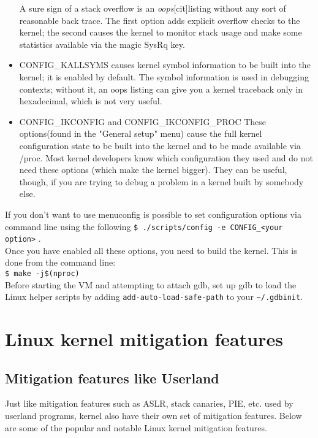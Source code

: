 \documentclass{masterthesis}
\begin{document}
\begin{itemize}
A sure sign of a stack overflow is an \emph{oops}[cit]listing without any sort of reasonable back trace. The first option adds explicit overflow checks to the kernel; the second causes the kernel to monitor stack usage and make some statistics available via the magic SysRq key.
\item CONFIG_KALLSYMS causes kernel symbol information to be built into the kernel; it is enabled by default. The symbol information is used in debugging contexts; without it, an oops listing can give you a kernel traceback only in hexadecimal, which is not very useful.
\item CONFIG_IKCONFIG and CONFIG_IKCONFIG_PROC
These options(found in the "General setup" menu)  cause the full kernel configuration state to be built into the kernel and to be made available via /proc. Most kernel developers know which configuration they used and do not need these options (which make the kernel bigger). They can be useful, though, if you are trying to debug a problem in a kernel built by somebody else.
\end{itemize}

If you don’t want to use menuconfig is possible to set configuration options via command line using the following
\lstinline{$ ./scripts/config -e CONFIG_<your option>} .\\
Once you have enabled all these options, you need to build the kernel.
This is done from the command line:\\
\lstinline{$ make -j$(nproc)}\\
Before starting the VM and attempting to attach gdb, set up gdb to load the Linux helper scripts by adding \lstinline{add-auto-load-safe-path} to your \lstinline{~/.gdbinit}.

\chapter{Linux kernel mitigation features}
\label{ch:mitigation}
\section{Mitigation features like Userland}
\label{sect:like userland}
Just like mitigation features such as ASLR, stack canaries, PIE, etc. used by userland programs, kernel also have their own set of mitigation features. Below are some of the popular and notable Linux kernel mitigation features.
\end{document}
